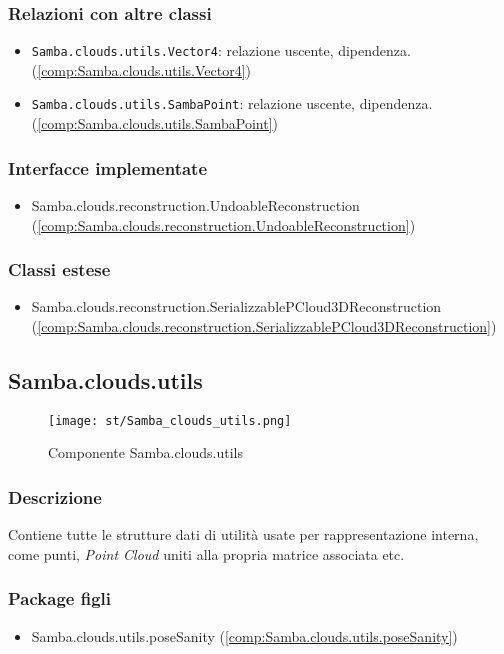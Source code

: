 \subsubsection{Relazioni con altre classi}
\begin{itemize}
	\item \texttt{Samba.clouds.utils.Vector4}: relazione uscente, dipendenza. (\ref{comp:Samba.clouds.utils.Vector4})
	\item \texttt{Samba.clouds.utils.SambaPoint}: relazione uscente, dipendenza. (\ref{comp:Samba.clouds.utils.SambaPoint})
\end{itemize}
\subsubsection{Interfacce implementate}
\begin{itemize}
	\item Samba.clouds.reconstruction.UndoableReconstruction (\ref{comp:Samba.clouds.reconstruction.UndoableReconstruction})
\end{itemize}
\subsubsection{Classi estese}
\begin{itemize}
	\item Samba.clouds.reconstruction.SerializzablePCloud3DReconstruction (\ref{comp:Samba.clouds.reconstruction.SerializzablePCloud3DReconstruction})
\end{itemize}


\newpage
\subsection{Samba.clouds.utils}\label{comp:Samba.clouds.utils}
\begin{figure}[H] 
    \centering 
    \texttt{[image: st/Samba\_clouds\_utils.png]} 
    \caption{Componente Samba.clouds.utils}
\end{figure}
\subsubsection{Descrizione}
Contiene tutte le strutture dati di utilità usate per rappresentazione interna, come punti, \emph{Point Cloud} uniti alla propria matrice associata etc.
\subsubsection{Package figli}
\begin{itemize}
	\item Samba.clouds.utils.poseSanity (\ref{comp:Samba.clouds.utils.poseSanity})
\end{itemize}
